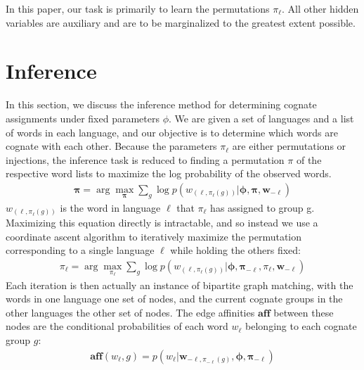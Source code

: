 \documentclass[11pt,a4paper]{article}
\begin{document}
In this paper, our task is primarily to learn the permutations
$\pi_\ell$. All other hidden variables are auxiliary and are to be
marginalized to the greatest extent possible.

\section{Inference}
In this section, we discuss the inference method for determining
cognate assignments under fixed parameters $\phi$.  We are given a
set of languages and a list of words in each language, and our
objective is to determine which words are cognate with each other.
Because the parameters $\pi_\ell$ are either permutations or injections,
the inference task is reduced to finding a permutation $\pi$ of the
respective word lists to maximize the log probability of the observed
words.
\begin{equation*}
  \begin{split}
    \mathbf{\pi} = \arg\!\max_{\mathbf \pi} \sum_{g} \log p(w_{(\ell,\pi_\ell(g))}|\mathbf \phi,\mathbf \pi, \mathbf{w}_{-\ell})
   \end{split}
 \end{equation*}
$w_{(\ell,\pi_\ell(g))}$ is the word in language $\ell$ that
$\pi_\ell$ has assigned to group g. Maximizing this equation
directly is intractable, and so instead we use a coordinate ascent
algorithm to iteratively maximize the permutation corresponding to
a single language $\ell$ while holding the others fixed:
\begin{equation*}
  \begin{split}
    \pi_\ell = \arg\!\max_{\pi_\ell} \sum_{g} \log p(w_{(\ell,\pi_\ell(g))}|\mathbf \phi,\mathbf \pi_{-\ell},\pi_\ell, \mathbf{w}_{-\ell})
  \end{split}
\end{equation*}
Each iteration is then actually an instance of bipartite graph
matching, with the words in one language one set of nodes, and the
current cognate groups in the other languages the other set of
nodes. The edge affinities $\mathbf{aff}$ between these nodes are the conditional
probabilities of each word $w_\ell$ belonging to each cognate group $g$:
\begin{equation*}
  \begin{split}
    \mathbf{aff}(w_\ell,g) = p(w_\ell|\mathbf w_{-\ell,\pi_{-\ell}(g)},\mathbf \phi,\mathbf\pi_{-\ell})
   \end{split}
 \end{equation*}
\end{document}

